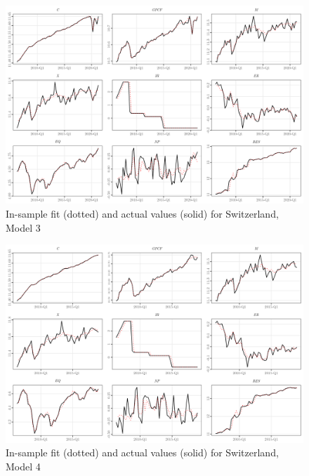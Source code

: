 \documentclass[a4paper, twoside]{templates/ociamthesis}
\begin{document}
\begin{figure}[!ht]

{\centering \includegraphics[width=0.99\columnwidth]{figure/g.model3t.ch} 

}

\caption{In-sample fit (dotted) and actual values (solid) for Switzerland, Model 3}\label{fig:Figure5FITCH3}
\end{figure}

\begin{figure}[!ht]

{\centering \includegraphics[width=0.99\columnwidth]{figure/g.model4t.ch} 

}

\caption{In-sample fit (dotted) and actual values (solid) for Switzerland, Model 4}\label{fig:Figure5FITCH4}
\end{figure}

\clearpage
\end{document}
